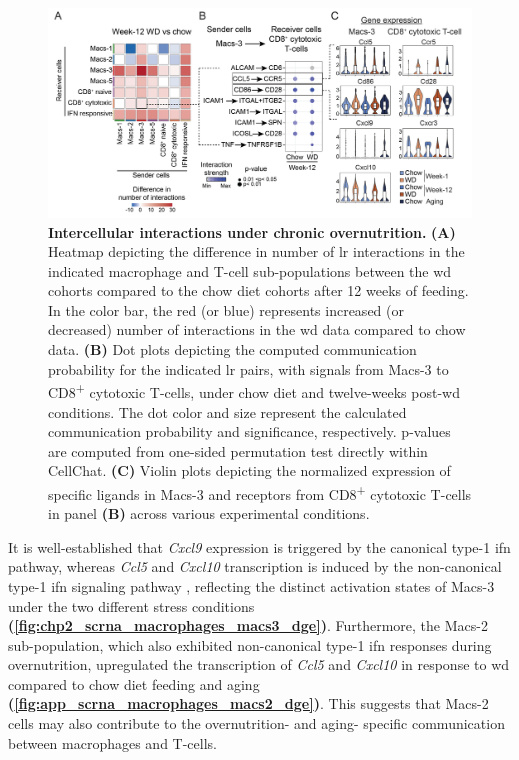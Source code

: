 \begin{figure}[t!]
\centering
\includegraphics[width=\linewidth]{Chapter4/Fig/F2-7-01.png}
\caption[Intercellular interactions under chronic overnutrition]{\textbf{Intercellular interactions under chronic overnutrition.} \textbf{(A)} Heatmap depicting the difference in number of \gls{lr} interactions in the indicated macrophage and T-cell sub-populations between the \gls{wd} cohorts compared to the chow diet cohorts after 12 weeks of feeding. In the color bar, the red (or blue) represents increased (or decreased) number of interactions in the \gls{wd} data compared to chow data. \textbf{(B)} Dot plots depicting the computed communication probability for the indicated \gls{lr} pairs, with signals from Macs-3 to CD8\textsuperscript{+} cytotoxic T-cells, under chow diet and twelve-weeks post-\gls{wd} conditions. The dot color and size represent the calculated communication probability and significance, respectively. p-values are computed from one-sided permutation test directly within CellChat. \textbf{(C)} Violin plots depicting the normalized expression of specific ligands in Macs-3 and receptors from CD8\textsuperscript{+} cytotoxic T-cells in panel \textbf{(B)} across various experimental conditions.}
\label{fig:chp2_scrna_cellchat2}
\end{figure}

It is well-established that \textit{Cxcl9} expression is triggered by the canonical type-1 \gls{ifn} pathway, whereas \textit{Ccl5} and \textit{Cxcl10} transcription is induced by the non-canonical type-1 \gls{ifn} signaling pathway \textbf{\cite{mazewski_type_2020}}, reflecting the distinct activation states of Macs-3 under the two different stress conditions \textbf{(\autoref{fig:chp2_scrna_macrophages_macs3_dge})}. Furthermore, the Macs-2 sub-population, which also exhibited non-canonical type-1 \gls{ifn} responses during overnutrition, upregulated the transcription of \textit{Ccl5} and \textit{Cxcl10} in response to \gls{wd} compared to chow diet feeding and aging \textbf{(\autoref{fig:app_scrna_macrophages_macs2_dge})}. This suggests that Macs-2 cells may also contribute to the overnutrition- and aging- specific communication between macrophages and T-cells. 


